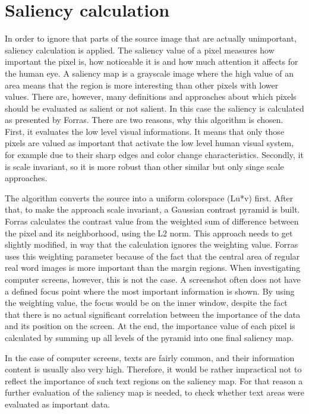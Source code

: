 \documentclass[draft,final]{vutinfth} %
\begin{document}
	\section{Saliency calculation}
	In order to ignore that parts of the source image that are actually unimportant, saliency calculation is applied.
	The saliency value of a pixel measures how important the pixel is, how noticeable it is and how much attention it affects for the human eye.
	A saliency map is a grayscale image where the high value of an area means that the region is more interesting than other pixels with lower values.
	There are, however, many definitions and approaches about which pixels should be evaluated as salient or not salient.
	In this case the saliency is calculated as presented by Forras. 
	There are two reasons, why this algorithm is chosen.
	First, it evaluates the low level visual informations.
	It means that only those pixels are valued as important that activate the low level human visual system, for example due to their sharp edges and color change characteristics.
	Secondly, it is scale invariant, so it is more robust than other similar but only singe scale approaches.\par 
	The algorithm converts the source into a uniform colorspace (Lu*v) first.
	After that, to make the approach scale invariant, a Gaussian contrast pyramid is built.
	Forras calculates the contrast value from the weighted sum of difference between the pixel and its neighborhood, using the L2 norm.
	This approach needs to get slightly modified, in way that the calculation ignores the weighting value.
	Forras uses this weighting parameter because of the fact that the central area of regular real word images is more important than the margin regions.
	When investigating computer screens, however, this is not the case.
	A screenshot often does not have a defined focus point where the most important information is shown.
	By using the weighting value, the focus would be on the inner window, despite the fact that there is no actual significant correlation between the importance of the data and its position on the screen.
	At the end, the importance value of each pixel is calculated by summing up all levels of the pyramid into one final saliency map.\par
	In the case of computer screens, texts are fairly common, and their information content is usually also very high.
	Therefore, it would be rather impractical not to reflect the importance of such text regions on the saliency map. 
	For that reason a further evaluation of the saliency map is needed, to check whether text areas were evaluated as important data.\par 
\end{document}
